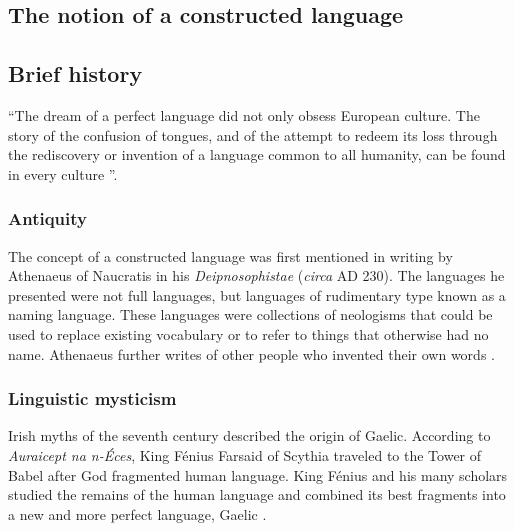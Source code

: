 \documentclass[14pt, a4paper]{extreport}
\begin{document}
\subsection{The notion of a constructed language}


%

\subsection{Brief history}
``The dream of a perfect language did not only obsess European culture. The story of the confusion of tongues, and of the attempt to redeem its loss through the rediscovery or invention of a language common to all humanity, can be found in every culture \parencite[1]{eco}''.

\subsubsection{Antiquity}
The concept of a constructed language was first mentioned in writing by Athenaeus of Naucratis in his \textit{Deipnosophistae} (\textit{circa} \textsc{AD} 230). The languages he presented were not full languages, but languages of rudimentary type known as a naming language. These languages were collections of neologisms that could be used to replace existing vocabulary or to refer to things that otherwise had no name. Athenaeus further writes of other people who invented their own words \parencite{sanders}.

\subsubsection{Linguistic mysticism}
Irish myths of the seventh century described the origin of Gaelic. According to \textit{Auraicept na n-Éces}, King Fénius Farsaid of Scythia traveled to the Tower of Babel after God fragmented human language. King Fénius and his many scholars studied the remains of the human language and combined its best fragments into a new and more perfect language, Gaelic \parencite{williams}.
\end{document}
